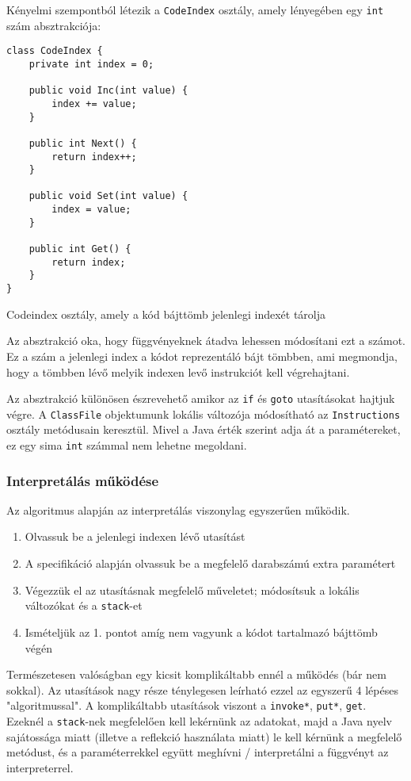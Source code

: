 Kényelmi szempontból létezik a \lstinline{CodeIndex} osztály, amely lényegében egy \lstinline{int} szám absztrakciója:
\begin{listing}[H]
\begin{verbatim}
class CodeIndex {
    private int index = 0;

    public void Inc(int value) {
        index += value;
    }

    public int Next() {
        return index++;
    }

    public void Set(int value) {
        index = value;
    }

    public int Get() {
        return index;
    }
}
\end{verbatim}
\caption{Codeindex osztály, amely a kód bájttömb jelenlegi indexét tárolja}
\end{listing}
Az absztrakció oka, hogy függvényeknek átadva lehessen módosítani ezt a számot. Ez a szám a jelenlegi index a kódot reprezentáló bájt tömbben, ami megmondja, hogy a tömbben lévő melyik indexen levő instrukciót kell végrehajtani.

Az absztrakció különösen észrevehető amikor az \lstinline{if} és \lstinline{goto} utasításokat hajtjuk végre. A \lstinline{ClassFile} objektumunk lokális változója módosítható az \lstinline{Instructions} osztály metódusain keresztül. Mivel a Java érték szerint adja át a paramétereket, ez egy sima \lstinline{int} számmal nem lehetne megoldani.

\subsubsection{Interpretálás működése}

Az algoritmus alapján az interpretálás viszonylag egyszerűen működik.
\begin{enumerate}
	\item Olvassuk be a jelenlegi indexen lévő utasítást
	\item A specifikáció alapján olvassuk be a megfelelő darabszámú extra paramétert
	\item Végezzük el az utasításnak megfelelő műveletet; módosítsuk a lokális változókat és a \lstinline{stack}-et
	\item Ismételjük az 1. pontot amíg nem vagyunk a kódot tartalmazó bájttömb végén
\end{enumerate}

Természetesen valóságban egy kicsit komplikáltabb ennél a működés (bár nem sokkal). Az utasítások nagy része ténylegesen leírható ezzel az egyszerű 4 lépéses "algoritmussal". A komplikáltabb utasítások viszont a \lstinline{invoke*}, \lstinline{put*}, \lstinline{get}. Ezeknél a \lstinline{stack}-nek megfelelően kell lekérnünk az adatokat, majd a Java nyelv sajátossága miatt (illetve a reflekció használata miatt) le kell kérnünk a megfelelő metódust, és a paraméterrekkel együtt meghívni / interpretálni a függvényt az interpreterrel.

